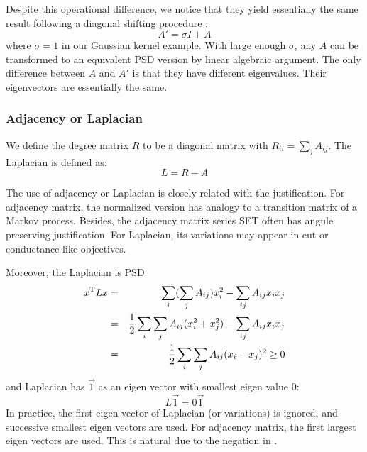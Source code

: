 Despite this operational difference, we notice that they yield 
essentially the same result following a diagonal shifting procedure
\cite{dhillon2004unified}:
\begin{equation}
	A' = \sigma I + A
\end{equation}
where $\sigma = 1$ in our Gaussian kernel example. 
With large enough $\sigma$, any $A$ can be transformed to 
an equivalent PSD version by linear algebraic argument. 
The only difference between $A$ and $A'$ is that they 
have different eigenvalues. Their eigenvectors are 
essentially the same. 

\subsubsection{Adjacency or Laplacian}
\label{sec:adj_lap}

We define the degree matrix $R$ to be a diagonal matrix with 
$R_{ii} = \sum_j{A_{ij}}$. The Laplacian is defined as:
\begin{equation}
	L = R - A
	\label{eq:def_lap}
\end{equation}

The use of adjacency or Laplacian is closely related with 
the justification. For adjacency matrix, the normalized version 
has analogy to a transition matrix of a Markov process. 
Besides, the adjacency matrix series SET often has 
angule preserving justification. 
For Laplacian, its variations may appear in cut or conductance
like objectives. 

Moreover, the Laplacian is PSD:
\begin{eqnarray}
	x^\mathrm{T}Lx &=& \sum_i (\sum_j{A_{ij}})x_i^2
		- \sum_{ij}A_{ij}x_ix_j \nonumber \\
		&=& \frac{1}{2} \sum_i\sum_j{A_{ij}}(x_i^2+x_j^2) 
		- \sum_{ij}A_{ij}x_ix_j \nonumber \\
		&=& \frac{1}{2} \sum_i\sum_j{A_{ij}}(x_i-x_j)^2 \ge 0
		\label{eq:lap_psd}
\end{eqnarray}
and Laplacian has $\vec{1}$ as an eigen vector with smallest eigen 
value 0:
\begin{equation}
	L \vec{1} = 0 \vec{1}
\end{equation}
In practice, the first eigen vector of Laplacian (or variations) is 
ignored, and successive smallest eigen vectors are used. For adjacency 
matrix, the first largest eigen vectors are used. This is natural 
due to the negation in \req{\ref{eq:def_lap}}. 

